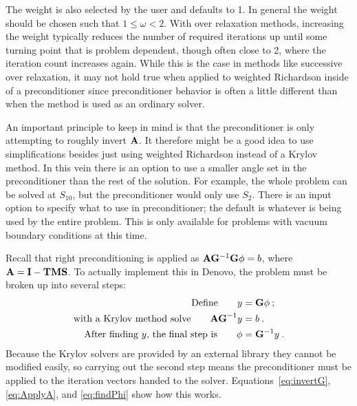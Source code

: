 The weight is also selected by the user and defaults to 1. In general the weight should be chosen such that $1 \le \omega < 2$. With over relaxation methods, increasing the weight typically reduces the number of required iterations up until some turning point that is problem dependent, though often close to 2, where the iteration count increases again. While this is the case in methods like successive over relaxation, it may not hold true when applied to weighted Richardson inside of a preconditioner since preconditioner behavior is often a little different than when the method is used as an ordinary solver.

An important principle to keep in mind is that the preconditioner is only attempting to roughly invert $\mathbf{A}$. It therefore might be a good idea to use simplifications besides just using weighted Richardson instead of a Krylov method. In this vein there is an option to use a smaller angle set in the preconditioner than the rest of the solution. For example, the whole problem can be solved at $S_{10}$, but the preconditioner would only use $S_{2}$. There is an input option to specify what to use in preconditioner; the default is whatever is being used by the entire problem. This is only available for problems with vacuum boundary conditions at this time. 

Recall that right preconditioning is applied as $\mathbf{A} \mathbf{G}^{-1} \mathbf{G} \phi = b$, where $\mathbf{A} = \mathbf{I} - \mathbf{TMS}$. To actually implement this in Denovo, the problem must be broken up into several steps: 
%
\begin{align}
  \text{Define} \qquad y &= \mathbf{G}\phi \:;\\
  \text{with a Krylov method solve} \qquad \mathbf{AG}^{-1}y &= b \:. \\
  \text{After finding }y\text{, the final step is} \qquad \phi &= \mathbf{G}^{-1}y \:.
\end{align}
%
Because the Krylov solvers are provided by an external library they cannot be modified easily, so carrying out the second step means the preconditioner must be applied to the iteration vectors handed to the solver. Equations~\eqref{eq:invertG}, \eqref{eq:ApplyA}, and \eqref{eq:findPhi} show how this works.  


